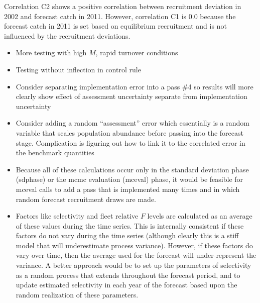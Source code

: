 Correlation C2 shows a positive correlation between recruitment deviation in 2002 and forecast catch in 2011. However, correlation C1 is 0.0 because the forecast catch in 2011 is set based on equilibrium recruitment and is not influenced by the recruitment deviations.

\begin{itemize}
	\item More testing with high $M$, rapid turnover conditions
	\item Testing without inflection in control rule
	\item Consider separating implementation error into a pass \#4 so results will more clearly show effect of assessment uncertainty separate from implementation uncertainty
	\item Consider adding a random ``assessment'' error which essentially is a random variable that scales population abundance before passing into the forecast stage. Complication is figuring out how to link it to the correlated error in the benchmark quantities
	\item Because all of these calculations occur only in the standard deviation phase (sdphase) or the \gls{mcmc} evaluation (mceval) phase, it would be feasible for mceval calls to add a pass that is implemented many times and in which random forecast recruitment draws are made.
	\item Factors like selectivity and fleet relative $F$ levels are calculated as an average of these values during the time series. This is internally consistent if these factors do not vary during the time series (although clearly this is a stiff model that will underestimate process variance). However, if these factors do vary over time, then the average used for the forecast will under-represent the variance. A better approach would be to set up the parameters of selectivity as a random process that extends throughout the forecast period, and to update estimated selectivity in each year of the forecast based upon the random realization of these parameters.
\end{itemize}

	
